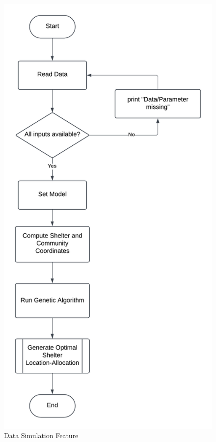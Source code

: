 \begin{appendices}
\begin{centerappendixtitle}
		\begin{figure}[h]
			\centering
			\caption{Data Simulation Feature}
			\label{simFlow}
			\includegraphics[width=\textwidth,height=\textheight,keepaspectratio]{appendix/datasim f}
		\end{figure}
		

\end{centerappendixtitle}
\end{appendices}

